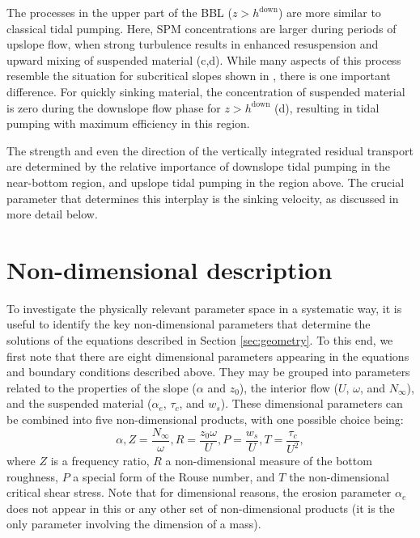 The processes in the upper part of the BBL ($z>h^\text{down}$) are
more similar to classical tidal pumping. Here, SPM concentrations are
larger during periods of upslope flow, when strong turbulence results
in enhanced resuspension and upward mixing of suspended material
(c,d). While many aspects of this process
resemble the situation for subcritical slopes shown in
, there is one important difference. For quickly
sinking material, the concentration of suspended material is zero
during the downslope flow phase for $z>h^\text{down}$
(d), resulting in tidal pumping with maximum
efficiency in this region.

The strength and even the direction of the vertically integrated
residual transport are determined by the relative importance of
downslope tidal pumping in the near-bottom region, and upslope tidal
pumping in the region above. The crucial parameter that determines
this interplay is the sinking velocity, as discussed in more detail
below.

\section{Non-dimensional description\label{sec:nondim}}

To investigate the physically relevant parameter space in a systematic
way, it is useful to identify the key non-dimensional parameters that
determine the solutions of the equations described in Section
\ref{sec:geometry}. To this end, we first note that there are eight
dimensional parameters appearing in the equations and boundary
conditions described above. They may be grouped into parameters
related to the properties of the slope ($\alpha$ and $z_0$), the
interior flow ($U$, $\omega$, and $N_\infty$), and the suspended
material ($\alpha_e$, $\tau_c$, and $w_s$). These dimensional
parameters can be combined into five non-dimensional products, with
one possible choice being:
\begin{equation}
  \label{pi}
  \alpha \comma Z = \dfrac{N_\infty}{\omega} \comma R = \dfrac{z_0 \omega}{U} \comma
  P = \dfrac{w_s}{U} \comma T = \dfrac{\tau_c}{U^2} \comma
\end{equation}
where $Z$ is a frequency ratio, $R$ a non-dimensional measure of the
bottom roughness, $P$ a special form of the Rouse number, and $T$ the
non-dimensional critical shear stress. Note that for dimensional
reasons, the erosion parameter $\alpha_e$ does not appear in this or
any other set of non-dimensional products (it is the only parameter
involving the dimension of a mass). 

